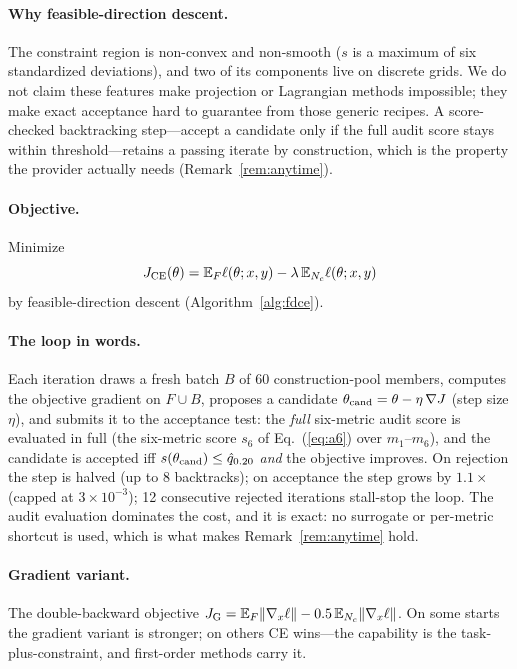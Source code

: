 \documentclass[lettersize,journal]{IEEEtran}
\begin{document}
\paragraph*{Why feasible-direction descent.} The constraint
region is non-convex and non-smooth ($s$ is a maximum of six
standardized deviations), and two of its components live on
discrete grids. We do not claim these features make
projection or Lagrangian methods impossible; they make exact
acceptance hard to guarantee from those generic recipes. A
score-checked backtracking step---accept a candidate only if
the full audit score stays within threshold---retains a
passing iterate by construction, which is the property the
provider actually needs (Remark~\ref{rem:anytime}).

\paragraph*{Objective.} Minimize
\begin{equation}
J_{\rm CE}(\theta) = \mathbb{E}_{F}\ell(\theta;x,y) -
\lambda\,\mathbb{E}_{N_c}\ell(\theta;x,y)
\label{eq:ce-objective}
\end{equation}
by feasible-direction descent (Algorithm~\ref{alg:fdce}).

\paragraph*{The loop in words.} Each iteration draws a fresh
batch $B$ of 60 construction-pool members, computes the
objective gradient on $F \cup B$, proposes a candidate
$\theta_{\rm cand} = \theta - \eta\,\nabla J$ (step size
$\eta$), and submits it to
the acceptance test: the \emph{full} six-metric audit score is
evaluated in full (the six-metric score $s_6$ of
Eq.~(\ref{eq:a6}) over $m_1$--$m_6$), and the candidate is
accepted iff
$s(\theta_{\rm cand}) \le \hat q_{0.20}$ \emph{and} the
objective improves. On rejection the step is halved (up to 8
backtracks); on acceptance the step grows by $1.1\times$
(capped at $3\times10^{-3}$); 12 consecutive rejected
iterations stall-stop the loop. The audit evaluation dominates
the cost, and it is exact: no surrogate or per-metric shortcut
is used, which is what makes Remark~\ref{rem:anytime} hold.

\paragraph*{Gradient variant.} The double-backward objective
$J_{\rm G} = \mathbb{E}_F\|\nabla_x\ell\| -
0.5\,\mathbb{E}_{N_c}\|\nabla_x\ell\|$. On some starts the
gradient variant is stronger; on others CE wins---the capability
is the task-plus-constraint, and first-order methods carry it.
\end{document}
